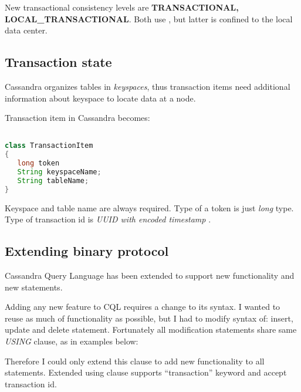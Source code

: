 New transactional consistency levels are \textbf{TRANSACTIONAL, LOCAL_TRANSACTIONAL}. Both use \mpp, but latter is confined to the local data center.

\subsection{Transaction state}
Cassandra organizes tables in \emph{keyspaces}, thus transaction items need additional information about keyspace to locate data at a node.

Transaction item in Cassandra becomes:

\begin{lstlisting}[language=Java,style=outcode,label={lst:txState},caption={Transaction item in Cassandra}]

class TransactionItem
{
   long token
   String keyspaceName;
   String tableName;
}
\end{lstlisting}

Keyspace and table name are always required. Type of a token is just \emph{long} type. Type of transaction id is \emph{UUID with encoded timestamp} \cite{CassandraUUID}.


\subsection{Extending binary protocol}
Cassandra Query Language has been extended to support new functionality and new statements.

Adding any new feature to CQL requires a change to its syntax. I wanted to reuse as much of functionality as possible, but I had to modify syntax of: insert, update and delete statement. Fortunately all modification statements share same \emph{USING} clause, as in examples below:



Therefore I could only extend this clause to add new functionality to all statements. Extended using clause supports “transaction” keyword and accept transaction id.


